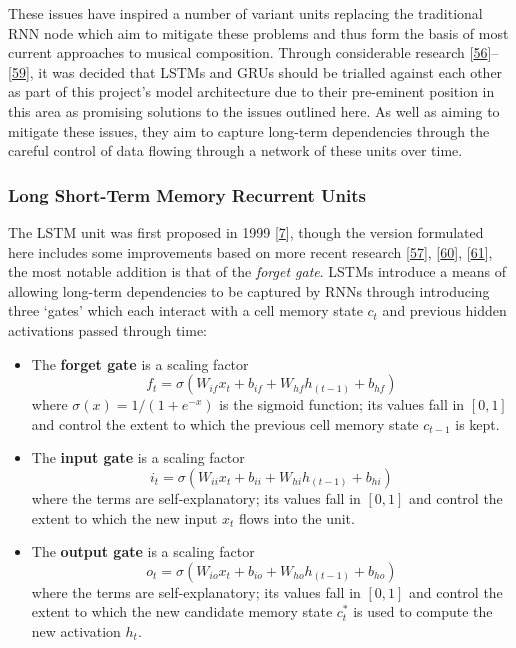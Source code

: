 \documentclass[12pt,]{article}
\providecommand{\tightlist}{%
  \setlength{\itemsep}{0pt}\setlength{\parskip}{0pt}}
\begin{document}
These issues have inspired a number of variant units replacing the
traditional RNN node which aim to mitigate these problems and thus form
the basis of most current approaches to musical composition. Through
considerable research
{[}\protect\hyperlink{ref-lipton2015critical}{56}{]}--{[}\protect\hyperlink{ref-dey2017gate}{59}{]},
it was decided that LSTMs and GRUs should be trialled against each other
as part of this project's model architecture due to their pre-eminent
position in this area as promising solutions to the issues outlined
here. As well as aiming to mitigate these issues, they aim to capture
long-term dependencies through the careful control of data flowing
through a network of these units over time.

\hypertarget{long-short-term-memory-recurrent-units}{%
\subsubsection{Long Short-Term Memory Recurrent
Units}\label{long-short-term-memory-recurrent-units}}

The LSTM unit was first proposed in 1999
{[}\protect\hyperlink{ref-gers1999learning}{7}{]}, though the version
formulated here includes some improvements based on more recent research
{[}\protect\hyperlink{ref-greff2017lstm}{57}{]},
{[}\protect\hyperlink{ref-sak2014long}{60}{]},
{[}\protect\hyperlink{ref-zebin2018human}{61}{]}, the most notable
addition is that of the \emph{forget gate}. LSTMs introduce a means of
allowing long-term dependencies to be captured by RNNs through
introducing three `gates' which each interact with a cell memory state
\(c_t\) and previous hidden activations passed through time:

\begin{itemize}
\tightlist
\item
  The \textbf{forget gate} is a scaling factor
  \[f_t = \sigma(W_{if} x_t + b_{if} + W_{hf} h_{(t-1)} + b_{hf})\]
  where \(\sigma(x) = 1 / (1 + e^{-x})\) is the sigmoid function; its
  values fall in \([0,1]\) and control the extent to which the previous
  cell memory state \(c_{t-1}\) is kept.
\item
  The \textbf{input gate} is a scaling factor
  \[i_t = \sigma(W_{ii} x_t + b_{ii} + W_{hi} h_{(t-1)} + b_{hi})\]
  where the terms are self-explanatory; its values fall in \([0,1]\) and
  control the extent to which the new input \(x_t\) flows into the unit.
\item
  The \textbf{output gate} is a scaling factor
  \[o_t = \sigma(W_{io} x_t + b_{io} + W_{ho} h_{(t-1)} + b_{ho})\]
  where the terms are self-explanatory; its values fall in \([0,1]\) and
  control the extent to which the new candidate memory state \(c^*_t\)
  is used to compute the new activation \(h_t\).
\end{itemize}
\end{document}
